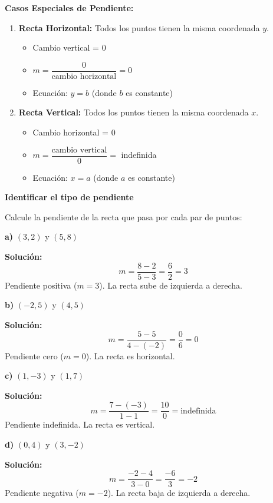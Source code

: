 \begin{theorem}
\textbf{Casos Especiales de Pendiente:}

\begin{enumerate}
    \item \textbf{Recta Horizontal:} Todos los puntos tienen la misma coordenada $y$.
    \begin{itemize}
        \item Cambio vertical = 0
        \item $m = \dfrac{0}{\text{cambio horizontal}} = 0$
        \item Ecuación: $y = b$ (donde $b$ es constante)
    \end{itemize}

    \item \textbf{Recta Vertical:} Todos los puntos tienen la misma coordenada $x$.
    \begin{itemize}
        \item Cambio horizontal = 0
        \item $m = \dfrac{\text{cambio vertical}}{0} = $ indefinida
        \item Ecuación: $x = a$ (donde $a$ es constante)
    \end{itemize}
\end{enumerate}
\end{theorem}

\begin{example}
\textbf{Identificar el tipo de pendiente}

Calcule la pendiente de la recta que pasa por cada par de puntos:

\textbf{a)} $(3, 2)$ y $(5, 8)$

\textbf{Solución:}
$$m = \frac{8 - 2}{5 - 3} = \frac{6}{2} = 3$$
Pendiente positiva ($m = 3$). La recta sube de izquierda a derecha.

\textbf{b)} $(-2, 5)$ y $(4, 5)$

\textbf{Solución:}
$$m = \frac{5 - 5}{4 - (-2)} = \frac{0}{6} = 0$$
Pendiente cero ($m = 0$). La recta es horizontal.

\textbf{c)} $(1, -3)$ y $(1, 7)$

\textbf{Solución:}
$$m = \frac{7 - (-3)}{1 - 1} = \frac{10}{0} = \text{indefinida}$$
Pendiente indefinida. La recta es vertical.

\textbf{d)} $(0, 4)$ y $(3, -2)$

\textbf{Solución:}
$$m = \frac{-2 - 4}{3 - 0} = \frac{-6}{3} = -2$$
Pendiente negativa ($m = -2$). La recta baja de izquierda a derecha.
\end{example}

